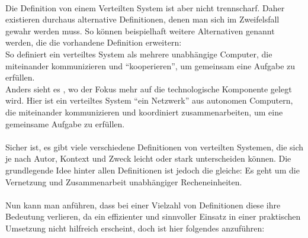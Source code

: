 \documentclass[../vs-script-first-v01.tex]{subfiles}
\begin{document}
\mbox{}\\
Die Definition von einem Verteilten System ist aber nicht trennscharf. Daher existieren durchaus alternative Definitionen, denen man sich im Zweifelsfall gewahr werden muss. So können beispielhaft weitere Alternativen genannt werden, die die vorhandene Definition erweitern: \\
So definiert \cite{garg2016distributed} ein verteiltes System als mehrere unabhängige Computer, die miteinander kommunizieren und \enquote{kooperieren}, um gemeinsam eine Aufgabe zu erfüllen.
\\
Anders sieht es \cite{mukherjee2015distributed}, wo der Fokus mehr auf die technologische Komponente gelegt wird. Hier ist ein verteiltes System \enquote{ein Netzwerk} aus autonomen Computern, die miteinander kommunizieren und koordiniert zusammenarbeiten, um eine gemeinsame Aufgabe zu erfüllen.
\\\\
Sicher ist, es gibt viele verschiedene Definitionen von verteilten Systemen, die sich je nach Autor, Kontext und Zweck leicht oder stark unterscheiden können. Die grundlegende Idee hinter allen Definitionen ist jedoch die gleiche: Es geht um die Vernetzung und Zusammenarbeit unabhängiger Recheneinheiten.
\\\\
Nun kann man anführen, dass bei einer Vielzahl von Definitionen diese ihre Bedeutung verlieren, da ein effizienter und sinnvoller Einsatz in einer praktischen Umsetzung nicht hilfreich erscheint, doch ist hier folgendes anzuführen: 
\end{document}
